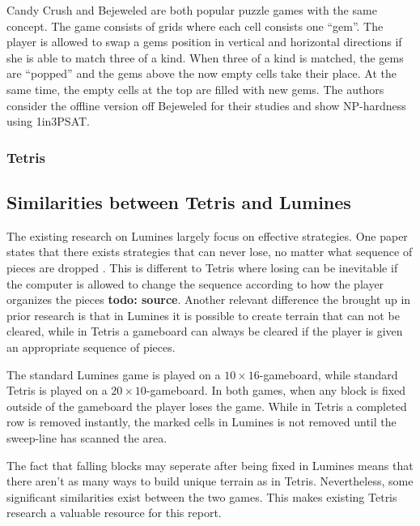 Candy Crush and Bejeweled are both popular puzzle games with the same concept. The game consists of grids where each cell consists one ``gem''. The player is allowed to swap a gems position in vertical and horizontal directions if she is able to match three of a kind. When three of a kind is matched, the gems are ``popped'' and the gems above the now empty cells take their place. At the same time, the empty cells at the top are filled with new gems. The authors consider the offline version off Bejeweled for their studies and show NP-hardness using 1in3PSAT. \cite{candy}

\subsubsection{Tetris}



\subsection{Similarities between Tetris and Lumines}
\label{subsub:sim}

The existing research on Lumines largely focus on effective strategies. One paper states that there exists strategies that can never lose, no matter what sequence of pieces are dropped \cite{lumines}. This is different to Tetris where losing can be inevitable if the computer is allowed to change the sequence according to how the player organizes the pieces \textbf{todo: source}. Another relevant difference the brought up in prior research is that in Lumines it is possible to create terrain that can not be cleared, while in Tetris a gameboard can always be cleared if the player is given an appropriate sequence of pieces.

The standard Lumines game is played on a $10 \times 16$-gameboard, while standard Tetris is played on a $20 \times 10$-gameboard. In both games, when any block is fixed outside of the gameboard the player loses the game. While in Tetris a completed row is removed instantly, the marked cells in Lumines is not removed until the sweep-line has scanned the area.

The fact that falling blocks may seperate after being fixed in Lumines means that there aren't as many ways to build unique terrain as in Tetris. Nevertheless, some significant similarities exist between the two games. This makes existing Tetris research a valuable resource for this report.
